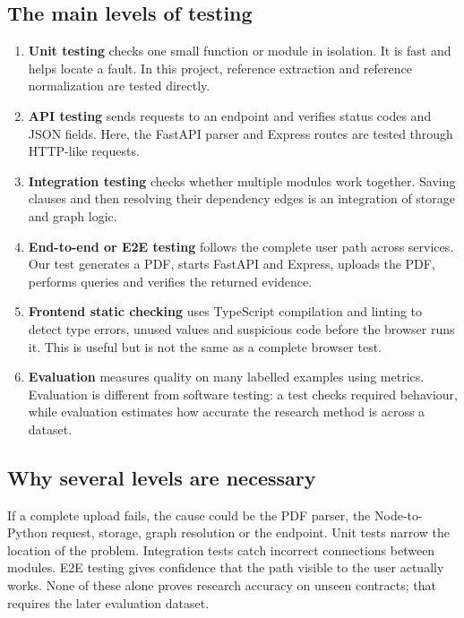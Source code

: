 \documentclass[11pt,letterpaper]{article}
\begin{document}
\subsection{The main levels of testing}
\begin{enumerate}
  \item \textbf{Unit testing} checks one small function or module in isolation. It is fast and helps locate a fault. In this project, reference extraction and reference normalization are tested directly.
  \item \textbf{API testing} sends requests to an endpoint and verifies status codes and JSON fields. Here, the FastAPI parser and Express routes are tested through HTTP-like requests.
  \item \textbf{Integration testing} checks whether multiple modules work together. Saving clauses and then resolving their dependency edges is an integration of storage and graph logic.
  \item \textbf{End-to-end or E2E testing} follows the complete user path across services. Our test generates a PDF, starts FastAPI and Express, uploads the PDF, performs queries and verifies the returned evidence.
  \item \textbf{Frontend static checking} uses TypeScript compilation and linting to detect type errors, unused values and suspicious code before the browser runs it. This is useful but is not the same as a complete browser test.
  \item \textbf{Evaluation} measures quality on many labelled examples using metrics. Evaluation is different from software testing: a test checks required behaviour, while evaluation estimates how accurate the research method is across a dataset.
\end{enumerate}

\subsection{Why several levels are necessary}
If a complete upload fails, the cause could be the PDF parser, the Node-to-Python request, storage, graph resolution or the endpoint. Unit tests narrow the location of the problem. Integration tests catch incorrect connections between modules. E2E testing gives confidence that the path visible to the user actually works. None of these alone proves research accuracy on unseen contracts; that requires the later evaluation dataset.

\newpage
\end{document}
